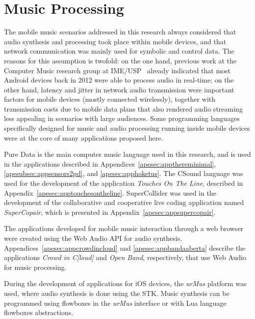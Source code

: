 \section{Music Processing}

The mobile music scenarios addressed in this research always considered that audio synthesis and processing took place within mobile devices, and that network communication was mainly used for symbolic and control data. The reasons for this assumption is twofold: on the one hand, previous work at the Computer Music research group at IME/USP~\citep{bianchi2014processamento} already indicated that most Android devices back in 2012 were able to process audio in real-time; on the other hand, latency and jitter in network audio transmission were important factors for mobile devices (mostly connected wirelessly), together with transmission costs due to mobile data plans that also rendered audio streaming less appealing in scenarios with large audiences. Some programming languages specifically designed for music and audio processing running inside mobile devices were at the core of many applications proposed here.


Pure Data is the main computer music language used in this research, and is used in the applications described in Appendices~\ref{apesec:appthereminimal}, \ref{apesubsec:appsensors2pd}, and \ref{apesec:apphoketus}.
The CSound language was used for the development of the application \textit{Touches On The Line}, described in Appendix~\ref{apesec:apptouchesontheline}.
SuperCollider was used in the development of the collaborative and cooperative live coding application named \textit{SuperCopair}, which is presented in Appendix~\ref{apesec:appsupercopair}.

The applications developed for mobile music interaction through a web browser were created using the Web Audio API for audio synthesis.
Appendices~\ref{apesec:appcrowdincloud} and \ref{apesec:appbandaaberta} describe the applications \textit{Crowd in C[loud]} and \textit{Open Band}, respectively, that use Web Audio for music processing.

During the development of applications for iOS devices, the \textit{urMus} platform was used, where audio synthesis is done using the STK.
Music synthesis can be programmed using flowboxes in the \textit{urMus} interface or with Lua language flowboxes abstractions.


